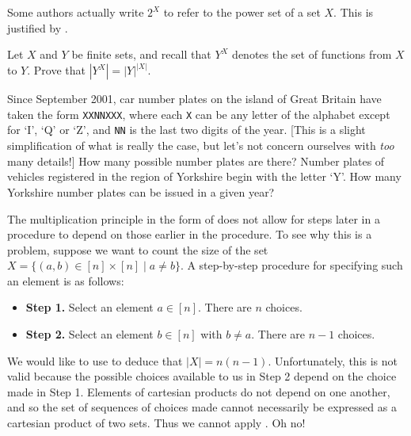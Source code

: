 Some authors actually write $2^X$ to refer to the power set of a set $X$. This is justified by .

\begin{exercise}
Let $X$ and $Y$ be finite sets, and recall that $Y^X$ denotes the set of functions from $X$ to $Y$. Prove that $|Y^X|=|Y|^{|X|}$.
\end{exercise}

\begin{exercise}
Since September 2001, car number plates on the island of Great Britain have taken the form \texttt{XX\;NN\;XXX}, where each \texttt{X} can be any letter of the alphabet except for `I', `Q' or `Z', and \texttt{NN} is the last two digits of the year. [This is a slight simplification of what is really the case, but let's not concern ourselves with \textit{too} many details!] How many possible number plates are there? Number plates of vehicles registered in the region of Yorkshire begin with the letter `Y'. How many Yorkshire number plates can be issued in a given year?
\end{exercise}

The multiplication principle in the form of  does not allow for steps later in a procedure to depend on those earlier in the procedure. To see why this is a problem, suppose we want to count the size of the set $X = \{ (a,b) \in [n] \times [n] \mid a \ne b \}$. A step-by-step procedure for specifying such an element is as follows:
\begin{itemize}
\item \textbf{Step 1.} Select an element $a \in [n]$. There are $n$ choices.
\item \textbf{Step 2.} Select an element $b \in [n]$ with $b \ne a$. There are $n-1$ choices.
\end{itemize}
We would like to use  to deduce that $|X| = n(n-1)$. Unfortunately, this is not valid because the possible choices available to us in Step 2 depend on the choice made in Step 1. Elements of cartesian products do not depend on one another, and so the set of sequences of choices made cannot necessarily be expressed as a cartesian product of two sets. Thus we cannot apply . Oh no!

